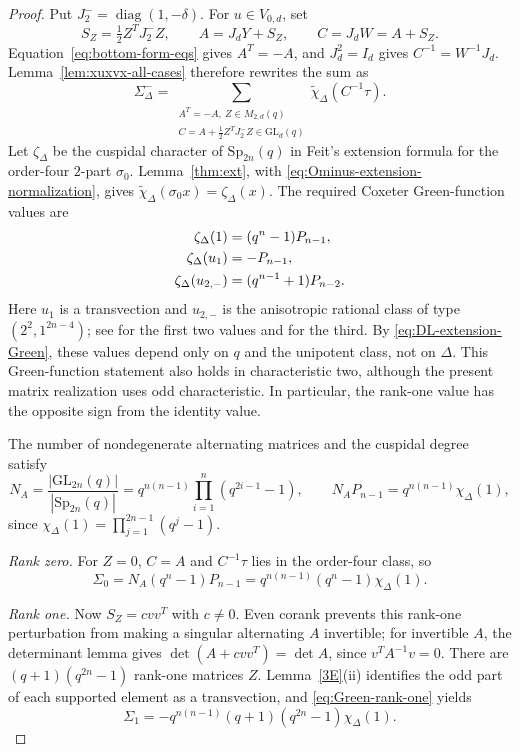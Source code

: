 \documentclass[12pt]{amsart}
\numberwithin{itemcounter}{subsection}
\theoremstyle{plain}
\theoremstyle{definition}
\theoremstyle{remark}
\numberwithin{equation}{section}
\def\Sp{\mathrm{Sp}}
\def\GL{\mathrm{GL}}
\begin{document}
\begin{proof}
Put \(J_2^-=\operatorname{diag}(1,-\delta)\).  For \(u\in V_{0,d}\), set
\[
 S_Z=\tfrac12Z^TJ_2^-Z,\qquad A=J_dY+S_Z,\qquad C=J_dW=A+S_Z.
\]
Equation~\eqref{eq:bottom-form-eqs} gives \(A^T=-A\), and
\(J_d^2=I_d\) gives \(C^{-1}=W^{-1}J_d\).
Lemma~\ref{lem:xuxvx-all-cases} therefore rewrites the sum as
\[
 \Sigma_\Delta^-=
 \sum_{\substack{A^T=-A,\ Z\in M_{2,d}(q)\\
 C=A+\frac12Z^TJ_2^-Z\in\GL_d(q)}}
 \widetilde\chi_\Delta(C^{-1}\tau).
\]
Let \(\zeta_\Delta\) be the cuspidal character of \(\Sp_{2n}(q)\) in
Feit's extension formula for the order-four \(2\)-part \(\sigma_0\).
Lemma~\ref{thm:ext}, with \eqref{eq:Ominus-extension-normalization}, gives
\(\widetilde\chi_\Delta(\sigma_0x)=\zeta_\Delta(x)\).
The required Coxeter Green-function values are
\begin{align}
\zeta_\Delta(1)&=(q^n-1)P_{n-1},\notag\\
\zeta_\Delta(u_1)&=-P_{n-1},
\label{eq:Green-rank-one}\\
\zeta_\Delta(u_{2,-})&=(q^{n-1}+1)P_{n-2}.
\label{eq:Green-rank-two-minus}
\end{align}
Here \(u_1\) is a transvection and \(u_{2,-}\) is the anisotropic rational
class of type \((2^2,1^{2n-4})\); see \cite[Corollary~10K]{Feit} for the
first two values and \cite[\S38]{Lus76Green} for the third.
By \eqref{eq:DL-extension-Green}, these values depend only on \(q\) and
the unipotent class, not on \(\Delta\).  This Green-function statement
also holds in characteristic two, although the present matrix realization
uses odd characteristic.  In particular, the rank-one value has the
opposite sign from the identity value.

The number of nondegenerate alternating matrices and the cuspidal degree
satisfy
\[
 N_A=\frac{|\GL_{2n}(q)|}{|\Sp_{2n}(q)|}
 =q^{n(n-1)}\prod_{i=1}^n(q^{2i-1}-1),\qquad
 N_AP_{n-1}=q^{n(n-1)}\chi_\Delta(1),
\]
since \(\chi_\Delta(1)=\prod_{j=1}^{2n-1}(q^j-1)\).

\smallskip
\noindent\emph{Rank zero.}
For \(Z=0\), \(C=A\) and \(C^{-1}\tau\) lies in the order-four class, so
\begin{equation}\label{eq:Sigma0}
\Sigma_0
=N_A(q^n-1)P_{n-1}
=q^{n(n-1)}(q^n-1)\chi_\Delta(1).
\end{equation}

\smallskip
\noindent\emph{Rank one.}
Now \(S_Z=cvv^T\) with \(c\ne0\).  Even corank prevents this rank-one
perturbation from making a singular alternating \(A\) invertible; for
invertible \(A\), the determinant lemma gives
\(\det(A+cvv^T)=\det A\), since \(v^TA^{-1}v=0\).
There are \((q+1)(q^{2n}-1)\) rank-one matrices \(Z\).
Lemma~\ref{3E}(ii) identifies the odd part of each supported element as a
transvection, and \eqref{eq:Green-rank-one} yields
\begin{equation}\label{eq:Sigma1}
\Sigma_1
=-q^{n(n-1)}(q+1)(q^{2n}-1)\chi_\Delta(1).
\end{equation}


\end{proof}
\end{document}
